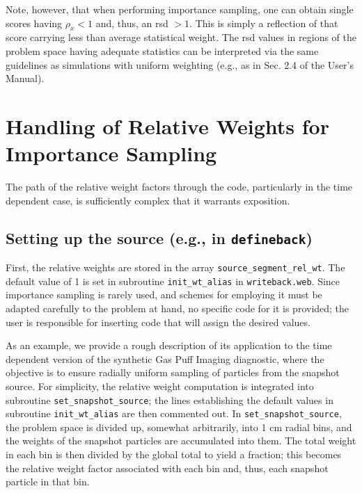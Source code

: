 \documentclass[12pt]{report}
\begin{document}
Note, however, that when performing importance sampling, one can 
obtain single scores having $\rho_{x} < 1$ and, thus, an rsd $> 1$.
This is simply a reflection of that score carrying less than average 
statistical weight.  The rsd values in regions of the problem space
having adequate statistics can be interpreted via the same guidelines
as simulations with uniform weighting (e.g., as in Sec. 2.4 of the 
User's Manual).

\section{Handling of Relative Weights for Importance Sampling}

The path of the relative weight factors through the code, particularly
in the time dependent case, is sufficiently complex that it warrants
exposition.

\subsection{Setting up the source (e.g., in {\tt defineback})}

First, the relative
weights are stored in the array {\tt source\_segment\_rel\_wt}.
The default value of 1 is set 
in subroutine {\tt init\_wt\_alias} in {\tt writeback.web}.
Since importance sampling is rarely used, and schemes for employing it
must be adapted carefully to the problem at hand, no specific
code for it is provided; the user
is responsible for inserting code that will assign the desired values.
  
As an example, we provide a rough description of its
application to the time dependent version of the synthetic Gas Puff Imaging
diagnostic, where the objective is to ensure radially uniform
sampling of particles from the snapshot source.  For simplicity, the
relative weight computation is integrated into subroutine
{\tt set\_snapshot\_source}; the lines establishing the default values
in subroutine {\tt init\_wt\_alias} are then commented out.
In {\tt set\_snapshot\_source}, the problem 
space is divided up, somewhat arbitrarily,  into 1 cm radial bins, 
and the weights of the snapshot particles are
accumulated into them.  The total weight in each bin is then divided by the
global total to yield a fraction; this becomes the relative weight
factor associated with each bin and, thus, each snapshot particle
in that bin.  
\end{document}
